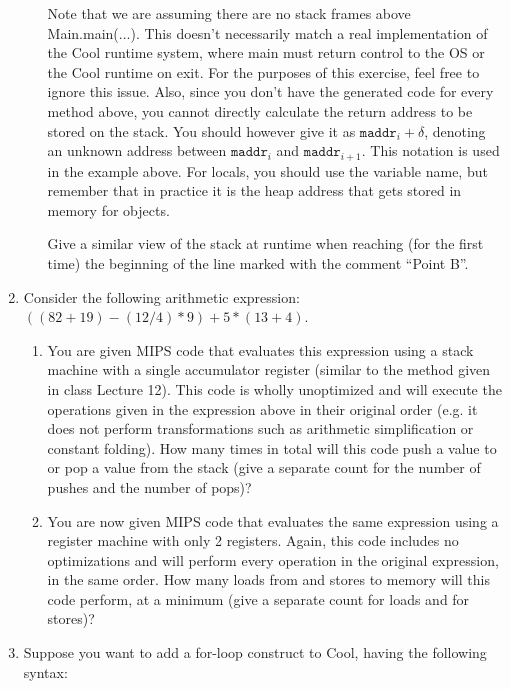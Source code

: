 \documentclass[11pt]{article}
\begin{document}
\begin{enumerate}
\begin{enumerate}
    Note that we are assuming there are no stack frames above Main.main(...). This doesn't necessarily match a real implementation of the Cool runtime system, where main must return control to the OS or the Cool runtime on exit. For the purposes of this exercise, feel free to ignore this issue. Also, since you don't have the generated code for every method above, you cannot directly calculate the return address to be stored on the stack. You should however give it as $\mathtt{maddr}_{i}+\delta$, denoting an unknown address between $\mathtt{maddr}_{i}$ and $\mathtt{maddr}_{i+1}$. This notation is used in the example above. For locals, you should use the variable name, but remember that in practice it is the heap address that gets stored in memory for objects.
    
    Give a similar view of the stack at runtime when reaching (for the first time) the beginning of the line marked with the comment ``Point B''.
  \end{enumerate}
  
  \item  Consider the following arithmetic expression: $((82+19)-(12/4)*9)+5*(13+4)$.
  
  \begin{enumerate}
    \item  You are given MIPS code that evaluates this expression using a stack machine with a single accumulator register (similar to the method given in class Lecture 12). This code is wholly unoptimized and will execute the operations given in the expression above in their original order (e.g. it does not perform transformations such as arithmetic simplification or constant folding). How many times in total will this code push a value to or pop a value from the stack (give a separate count for the number of pushes and the number of pops)?
    \item  You are now given MIPS code that evaluates the same expression using a register machine with only 2 registers. Again, this code includes no optimizations and will perform every operation in the original expression, in the same order. How many loads from and stores to memory will this code perform, at a minimum (give a separate count for loads and for stores)?
  \end{enumerate}
    
  \item  Suppose you want to add a for-loop construct to Cool, having the following syntax:\\
  

\end{enumerate}
\end{document}
